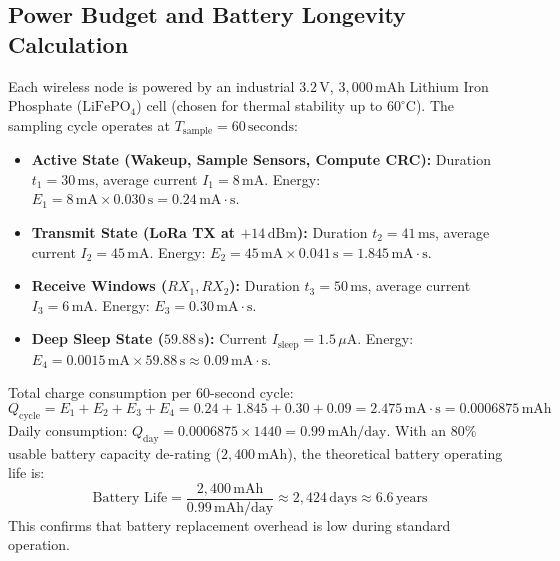 \documentclass[12pt]{article}
\begin{document}
\subsection{Power Budget and Battery Longevity Calculation}
Each wireless node is powered by an industrial $3.2\,\text{V}$, $3{,}000\,\text{mAh}$ Lithium Iron Phosphate ($\text{LiFePO}_4$) cell (chosen for thermal stability up to $60^\circ\text{C}$). The sampling cycle operates at $T_{\text{sample}} = 60\,\text{seconds}$:
\begin{itemize}
    \item \textbf{Active State (Wakeup, Sample Sensors, Compute CRC):} Duration $t_1 = 30\,\text{ms}$, average current $I_1 = 8\,\text{mA}$. Energy: $E_1 = 8\,\text{mA} \times 0.030\,\text{s} = 0.24\,\text{mA}\cdot\text{s}$.
    \item \textbf{Transmit State (LoRa TX at $+14\,\text{dBm}$):} Duration $t_2 = 41\,\text{ms}$, average current $I_2 = 45\,\text{mA}$. Energy: $E_2 = 45\,\text{mA} \times 0.041\,\text{s} = 1.845\,\text{mA}\cdot\text{s}$.
    \item \textbf{Receive Windows ($RX_1, RX_2$):} Duration $t_3 = 50\,\text{ms}$, average current $I_3 = 6\,\text{mA}$. Energy: $E_3 = 0.30\,\text{mA}\cdot\text{s}$.
    \item \textbf{Deep Sleep State ($59.88\,\text{s}$):} Current $I_{\text{sleep}} = 1.5\,\mu\text{A}$. Energy: $E_4 = 0.0015\,\text{mA} \times 59.88\,\text{s} \approx 0.09\,\text{mA}\cdot\text{s}$.
\end{itemize}
Total charge consumption per 60-second cycle:
\begin{equation}
Q_{\text{cycle}} = E_1 + E_2 + E_3 + E_4 = 0.24 + 1.845 + 0.30 + 0.09 = 2.475\,\text{mA}\cdot\text{s} = 0.0006875\,\text{mAh}
\end{equation}
Daily consumption: $Q_{\text{day}} = 0.0006875 \times 1440 = 0.99\,\text{mAh/day}$. With an 80\% usable battery capacity de-rating ($2{,}400\,\text{mAh}$), the theoretical battery operating life is:
\begin{equation}
\text{Battery Life} = \frac{2{,}400\,\text{mAh}}{0.99\,\text{mAh/day}} \approx 2{,}424\,\text{days} \approx 6.6\,\text{years}
\end{equation}
This confirms that battery replacement overhead is low during standard operation.
\end{document}
